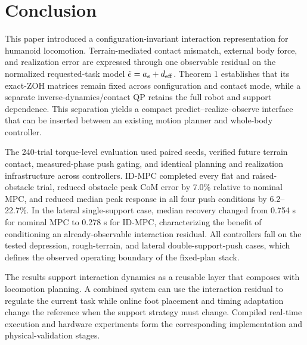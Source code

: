 \documentclass[journal]{IEEEtran}
\providecommand{\FloatBarrier}{}
\theoremstyle{plain}
\theoremstyle{definition}
\begin{document}
\FloatBarrier
\section{Conclusion}\label{sec:conclusion}

This paper introduced a configuration-invariant interaction representation for humanoid locomotion. Terrain-mediated contact mismatch, external body force, and realization error are expressed through one observable residual on the normalized requested-task model \(\ddot e=a_e+d_{\rm eff}\). Theorem 1 establishes that its exact-ZOH matrices remain fixed across configuration and contact mode, while a separate inverse-dynamics/contact QP retains the full robot and support dependence. This separation yields a compact predict--realize--observe interface that can be inserted between an existing motion planner and whole-body controller.

The 240-trial torque-level evaluation used paired seeds, verified future terrain contact, measured-phase push gating, and identical planning and realization infrastructure across controllers. ID-MPC completed every flat and raised-obstacle trial, reduced obstacle peak CoM error by 7.0\% relative to nominal MPC, and reduced median peak response in all four push conditions by 6.2--22.7\%. In the lateral single-support case, median recovery changed from 0.754 s for nominal MPC to 0.278 s for ID-MPC, characterizing the benefit of conditioning an already-observable interaction residual. All controllers fall on the tested depression, rough-terrain, and lateral double-support-push cases, which defines the observed operating boundary of the fixed-plan stack.

The results support interaction dynamics as a reusable layer that composes with locomotion planning. A combined system can use the interaction residual to regulate the current task while online foot placement and timing adaptation change the reference when the support strategy must change. Compiled real-time execution and hardware experiments form the corresponding implementation and physical-validation stages.
\end{document}
